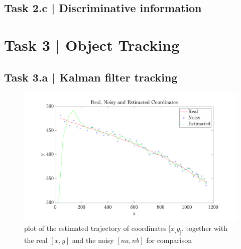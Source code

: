 \documentclass[conference]{IEEEtran}
\begin{document}
\subsection*{Task 2.c | Discriminative information}



\section*{Task 3 | Object Tracking}

\subsection*{Task 3.a | Kalman filter tracking}

\begin{figure}[htbp]
    \centering
    \includegraphics[width=\columnwidth]{figures/kalman.pdf}
    \caption{plot of the estimated trajectory of coordinates $[x_, y_]$, together with the real $[x,y]$ and the noisy $[na, nb]$ for comparison\label{fig:kalman}}
\end{figure}
\end{document}
